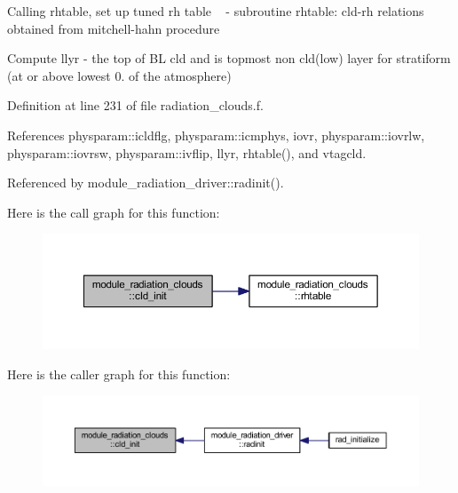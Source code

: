 \begin{DoxyEnumerate}
\item Calling rhtable, set up tuned rh table ~\newline
 -\/ subroutine rhtable\+: cld-\/rh relations obtained from mitchell-\/hahn procedure
\item Compute llyr -\/ the top of BL cld and is topmost non cld(low) layer for stratiform (at or above lowest 0. of the atmosphere) 
\end{DoxyEnumerate}

Definition at line 231 of file radiation\+\_\+clouds.\+f.



References physparam\+::icldflg, physparam\+::icmphys, iovr, physparam\+::iovrlw, physparam\+::iovrsw, physparam\+::ivflip, llyr, rhtable(), and vtagcld.



Referenced by module\+\_\+radiation\+\_\+driver\+::radinit().



Here is the call graph for this function\+:
\nopagebreak
\begin{figure}[H]
\begin{center}
\leavevmode
\includegraphics[width=350pt]{namespacemodule__radiation__clouds_ab6fef8945e0a409b2e0968b414ba5573_cgraph}
\end{center}
\end{figure}




Here is the caller graph for this function\+:
\nopagebreak
\begin{figure}[H]
\begin{center}
\leavevmode
\includegraphics[width=350pt]{namespacemodule__radiation__clouds_ab6fef8945e0a409b2e0968b414ba5573_icgraph}
\end{center}
\end{figure}



